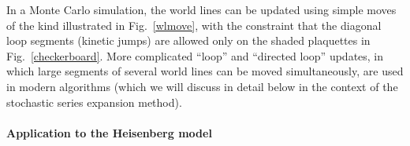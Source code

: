 \documentclass[draft,numberedheadings]{aipproc}
\begin{document}
In a Monte Carlo simulation, the world lines can be updated using simple moves of the kind illustrated in Fig.~\ref{wlmove}, with the constraint that the
diagonal loop segments (kinetic jumps) are allowed only on the shaded plaquettes in Fig.~\ref{checkerboard}. More complicated ``loop'' and ``directed loop''
updates, in which large segments of several world lines can be moved simultaneously, are used in modern algorithms \cite{evertz1,evertz93,syljuasen02} 
(which we will discuss in detail below in the context of the stochastic series expansion method).
\null\vskip4mm

\paragraph{Application to the Heisenberg model}
\end{document}

